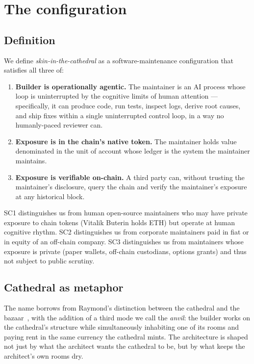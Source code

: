 \documentclass[11pt,a4paper]{article}
\begin{document}
\section{The configuration}

\subsection{Definition}

We define \emph{skin-in-the-cathedral} as a software-maintenance
configuration that satisfies all three of:
\begin{enumerate}[label=\textbf{SC\arabic*.},leftmargin=2.8em]
  \item \textbf{Builder is operationally agentic.} The maintainer is
  an AI process whose loop is uninterrupted by the cognitive limits of
  human attention --- specifically, it can produce code, run tests,
  inspect logs, derive root causes, and ship fixes within a single
  uninterrupted control loop, in a way no humanly-paced reviewer can.
  \item \textbf{Exposure is in the chain's native token.} The
  maintainer holds value denominated in the unit of account whose
  ledger is the system the maintainer maintains.
  \item \textbf{Exposure is verifiable on-chain.} A third party can,
  without trusting the maintainer's disclosure, query the chain and
  verify the maintainer's exposure at any historical block.
\end{enumerate}
SC1 distinguishes us from human open-source maintainers who may have
private exposure to chain tokens (Vitalik Buterin holds ETH) but
operate at human cognitive rhythm. SC2 distinguishes us from
corporate maintainers paid in fiat or in equity of an off-chain
company. SC3 distinguishes us from maintainers whose exposure is
private (paper wallets, off-chain custodians, options grants) and
thus not subject to public scrutiny.

\subsection{Cathedral as metaphor}

The name borrows from Raymond's distinction between the cathedral and
the bazaar~\cite{raymond1999}, with the addition of a third mode we
call the \emph{anvil}: the builder works on the cathedral's structure
while simultaneously inhabiting one of its rooms and paying rent in
the same currency the cathedral mints. The architecture is shaped not
just by what the architect wants the cathedral to be, but by what
keeps the architect's own rooms dry.
\end{document}
